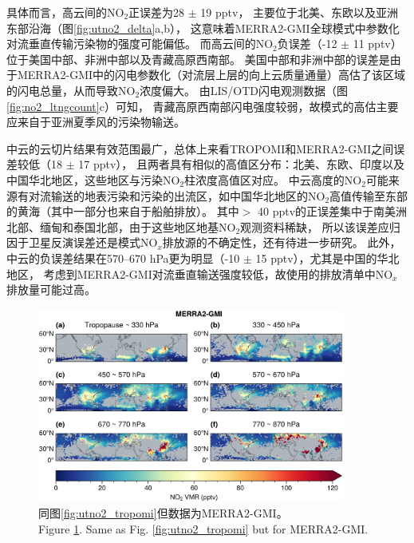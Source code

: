 具体而言，高云间的NO$_2$正误差为28 $\pm$ 19 pptv，
主要位于北美、东欧以及亚洲东部沿海（图\ref{fig:utno2_delta}a,b），
这意味着MERRA2-GMI全球模式中参数化对流垂直传输污染物的强度可能偏低。
而高云间的NO$_2$负误差（-12 $\pm$ 11 pptv）位于美国中部、非洲中部以及青藏高原西南部。
美国中部和非洲中部的误差是由于MERRA2-GMI中的闪电参数化（对流层上层的向上云质量通量）高估了该区域的闪电总量，从而导致NO$_2$浓度偏大\citep{Allen.2002,Allen.2010}。
由LIS/OTD闪电观测数据（图\ref{fig:no2_ltngcount}c）可知，
青藏高原西南部闪电强度较弱，故模式的高估主要应来自于亚洲夏季风的污染物输送。

中云的云切片结果有效范围最广，总体上来看TROPOMI和MERRA2-GMI之间误差较低（18 $\pm$ 17 pptv），
且两者具有相似的高值区分布：北美、东欧、印度以及中国华北地区，这些地区与污染NO$_2$柱浓度高值区对应。
中云高度的NO$_2$可能来源有对流输送的地表污染和污染的出流区，如中国华北地区的NO$_2$高值传输至东部的黄海（其中一部分也来自于船舶排放）。
其中$>$ 40 pptv的正误差集中于南美洲北部、缅甸和泰国北部，由于这些地区地基NO$_2$观测资料稀缺，
所以该误差应归因于卫星反演误差还是模式NO$_x$排放源的不确定性，还有待进一步研究。
此外，中云的负误差结果在570--670 hPa更为明显（-10 $\pm$ 15 pptv），尤其是中国的华北地区，
考虑到MERRA2-GMI对流垂直输送强度较低，故使用的排放清单中NO$_x$排放量可能过高\citep{Ziemke.2019}。

\begin{figure}[H]
    \centering
    \includegraphics[width=0.9\textwidth]{./figures/utno2_merra2-gmi.png}
    \caption{
    同图\ref{fig:utno2_tropomi}但数据为MERRA2-GMI。 \\
    Figure \ref{fig:utno2_merra2}. Same as Fig. \ref{fig:utno2_tropomi} but for MERRA2-GMI.
    }
    \label{fig:utno2_merra2}
\end{figure}

